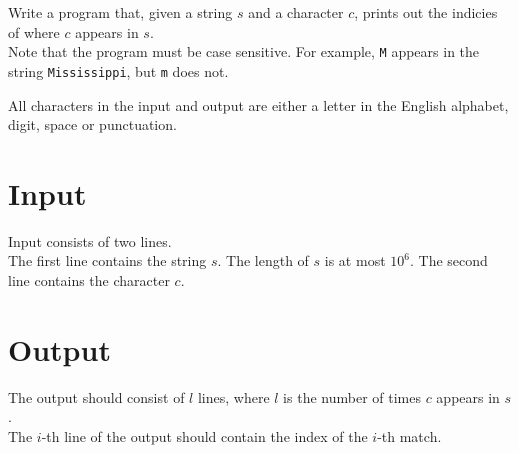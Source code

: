 
Write a program that, given a string $s$ and a character $c$, prints out the indicies of where $c$ appears in $s$. \\
Note that the program must be case sensitive.
For example, \texttt{M} appears in the string \texttt{Mississippi}, but \texttt{m} does not.

All characters in the input and output are either a letter in the English alphabet, digit, space or punctuation.

\section*{Input}
Input consists of two lines. \\
The first line contains the string $s$. The length of $s$ is at most $10^6$.
The second line contains the character $c$.

\section*{Output}
The output should consist of $l$ lines, where $l$ is the number of times $c$ appears in $s$. \\
The $i$-th line of the output should contain the index of the $i$-th match.
